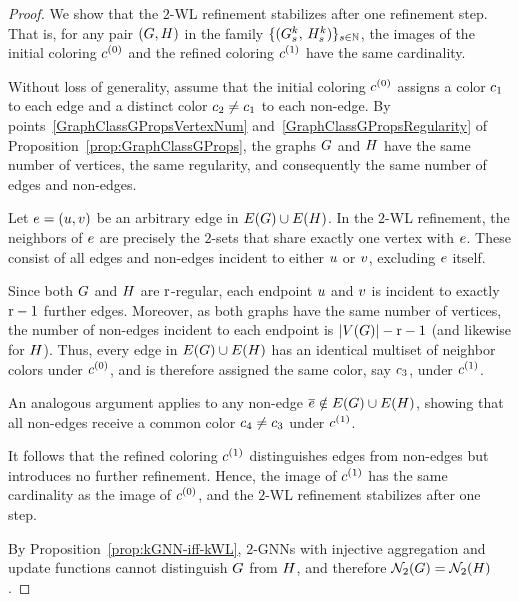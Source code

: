     
\begin{proof}
We show that the $2$-WL refinement stabilizes after one refinement step. That is, for any pair
$(G,H)$ in the family
$\{(G_s^k,\, H_s^k)\}_{s \in \mathbb{N}}$,
the images of the initial coloring $c^{(0)}$ and the refined coloring
$c^{(1)}$ have the same cardinality.

Without loss of generality, assume that the initial coloring $c^{(0)}$ assigns a color
$c_1$ to each edge and a distinct color $c_2 \neq c_1$ to each non-edge.
By points~\ref{GraphClassGPropsVertexNum} and~\ref{GraphClassGPropsRegularity} of
Proposition~\ref{prop:GraphClassGProps}, the graphs $G$ and $H$ have the same number
of vertices, the same regularity, and consequently the same number of edges and non-edges.

Let $e = (u,v)$ be an arbitrary edge in
$E(G) \cup E(H)$. In the $2$-WL refinement, the neighbors of $e$
are precisely the $2$-sets that share exactly one vertex with $e$. These consist of all edges
and non-edges incident to either $u$ or $v$, excluding $e$ itself.

Since both $G$ and $H$ are $\mathrm{r}$-regular, each endpoint $u$ and $v$
is incident to exactly $\mathrm{r} - 1$ further edges. Moreover, as both graphs have the same number of
vertices, the number of non-edges incident to each endpoint is
$|V(G)| - \mathrm{r} - 1$ (and likewise for $H$).
Thus, every edge in $E(G) \cup E(H)$ has an identical multiset of
neighbor colors under $c^{(0)}$, and is therefore assigned the same color, say
$c_3$, under $c^{(1)}$.

An analogous argument applies to any non-edge
$\overline{e} \notin E(G) \cup E(H)$, showing that all non-edges receive a
common color $c_4 \neq c_3$ under $c^{(1)}$.

It follows that the refined coloring $c^{(1)}$ distinguishes edges from non-edges but
introduces no further refinement. Hence, the image of $c^{(1)}$ has the same cardinality
as the image of $c^{(0)}$, and the $2$-WL refinement stabilizes after one step.

By Proposition~\ref{prop:kGNN-iff-kWL}, $2$-GNNs with injective aggregation and update functions
cannot distinguish $G$ from $H$, and therefore
$\mathcal{N}_2(G) = \mathcal{N}_2(H)$.
\end{proof}


